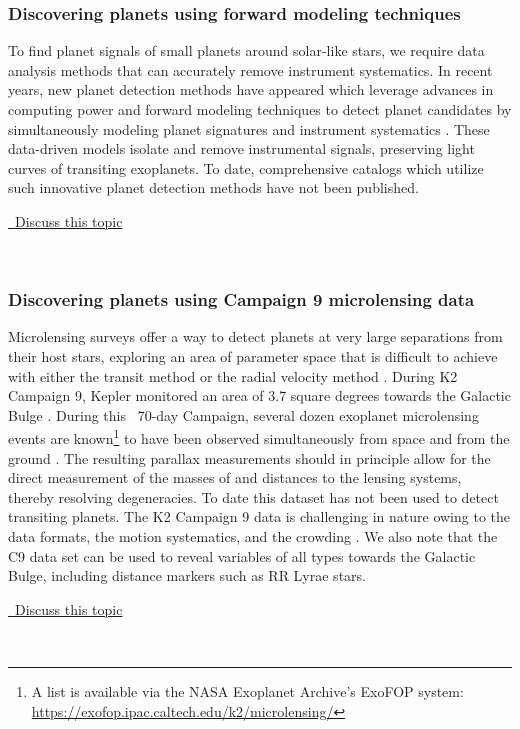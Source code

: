 \documentclass[modern]{aastex62}
\newcommand{\commentlink}[1]{\href{https://github.com/KeplerGO/ScientificOpportunities/issues/#1}{\sc \faExternalLink\ Discuss this topic}\,\,}
\begin{document}
\subsubsection{Discovering planets using forward modeling techniques} \label{sec:fwModelPlanets}
To find planet signals of small planets around solar-like stars, we require data analysis methods that can accurately remove instrument systematics. In recent years, new planet detection methods have appeared which leverage advances in computing power and forward modeling techniques to detect planet candidates by simultaneously modeling planet signatures and instrument systematics \citep[e.g.][]{foreman-mackey2015, luger2016, luger2018}.  These data-driven models isolate and remove instrumental signals, preserving light curves of transiting exoplanets. To date, comprehensive catalogs which utilize such innovative planet detection methods have not been published.
\\
\begin{center}
\commentlink{7}
\end{center}
\ \\

\subsubsection{Discovering planets using Campaign 9 microlensing data}
Microlensing surveys offer a way to detect planets at very large separations from their host stars, exploring an area of parameter space that is difficult to achieve with either the transit method or the radial velocity method \citep[e.g.][]{penny2018}. During K2 Campaign 9, Kepler monitored an area of 3.7 square degrees towards the Galactic Bulge \citep{henderson2016}.  During this ~70-day Campaign, several dozen exoplanet microlensing events are known\footnote{A list is available via the NASA Exoplanet Archive's ExoFOP system: \url{https://exofop.ipac.caltech.edu/k2/microlensing/}} to have been observed simultaneously from space and from the ground \citep[e.g.][]{zhu2017,kim2018}. The resulting parallax measurements should in principle allow for the direct measurement of the masses of and distances to the lensing systems, thereby resolving degeneracies. To date this dataset has not been used to detect transiting planets. The K2 Campaign 9 data is challenging in nature owing to the data formats, the motion systematics, and the crowding \citep[e.g. see][]{poleski2018}. We also note that the C9 data set can be used to reveal variables of all types towards the Galactic Bulge, including distance markers such as RR Lyrae stars.
\\
\begin{center}
\commentlink{8}
\end{center}
\ \\
\end{document}
